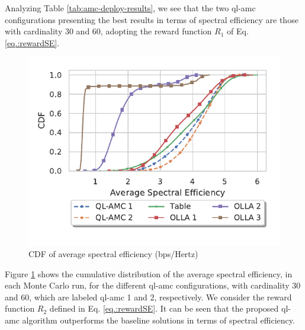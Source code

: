 Analyzing Table \ref{tab:amc-deploy-results}, we see that the two \gls{ql-amc} configurations presenting the best results in terms of spectral efficiency are those with cardinality 30 and 60, adopting the reward function $R_1$ of Eq. \eqref{eq.:rewardSE}.
%

\begin{figure}[tb]
\centerline{\includegraphics[width=0.7\columnwidth]{figures/chp_amc/SpecEff-Deploy.pdf}}
\vspace{-2ex}
\caption{CDF of average spectral efficiency (bps/Hertz)}
\label{fig:amc-dep-spceff}
\end{figure}

Figure \ref{fig:amc-dep-spceff} shows the cumulative distribution of the average spectral efficiency, in each Monte Carlo run, for the different \gls{ql-amc} configurations, with cardinality 30 and 60, which are labeled \gls{ql-amc} 1 and 2, respectively. We consider the reward function $R_2$ defined in Eq. \eqref{eq.:rewardSE}.
It can be seen that the proposed \gls{ql-amc} algorithm outperforms the baseline solutions in terms of spectral efficiency.






